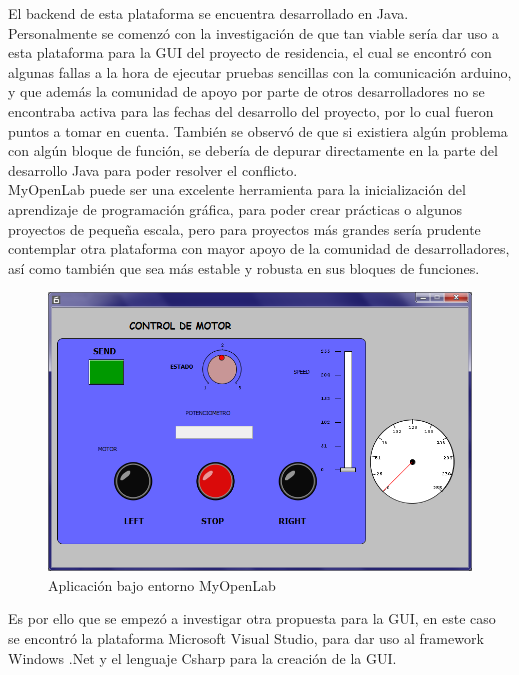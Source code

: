 \documentclass[12pt,titlepage]{article}
\begin{document}
El backend de esta plataforma se encuentra desarrollado en Java. \\ 

Personalmente se comenzó con la investigación de que tan viable sería dar uso a esta plataforma para la GUI del proyecto de residencia, el cual se encontró con algunas fallas a la hora de ejecutar pruebas sencillas con la comunicación arduino, y que además la comunidad de apoyo por parte de otros desarrolladores no se encontraba activa para las fechas del desarrollo del proyecto, por lo cual fueron puntos a tomar en cuenta. También se observó de que si existiera algún problema con algún bloque de función, se debería de depurar directamente en la parte del desarrollo Java para poder resolver el conflicto. \\ 

MyOpenLab puede ser una excelente herramienta para la inicialización del aprendizaje de programación gráfica, para poder crear prácticas o algunos proyectos de pequeña escala, pero para proyectos más grandes sería prudente contemplar otra plataforma con mayor apoyo de la comunidad de desarrolladores, así como también que sea más estable y robusta en sus bloques de funciones. 

 \begin{figure}[htbp]
\hspace*{4.2cm} 
\includegraphics[scale=0.30]{my_openlab}
\caption{Aplicación bajo entorno MyOpenLab}
\end{figure}
\newpage

Es por ello que se empezó a investigar otra propuesta para la GUI, en este caso se encontró la plataforma Microsoft Visual Studio, para dar uso al framework Windows .Net y el lenguaje Csharp para la creación de la GUI. \\ 
\end{document}
